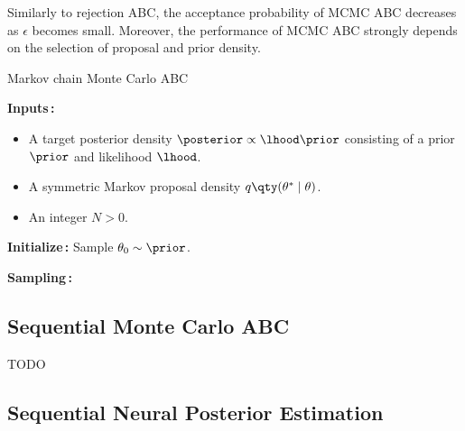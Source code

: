 Similarly to rejection ABC, the acceptance probability of MCMC ABC decreases as $\epsilon$ becomes small. Moreover, the performance of MCMC ABC strongly depends on the selection of proposal and prior density.

\begin{algorithm}[H]
\caption{Markov chain Monte Carlo ABC}
\label{alg:mcmcabc}
\SetAlgoLined
\DontPrintSemicolon
 \textbf{Inputs\,:}\;
 \vspace{-5mm}
 \begin{itemize}
     \item A target posterior density $\posterior \propto \lhood \prior$ consisting of a prior $\prior$ and likelihood $\lhood$. 
     \item A symmetric Markov proposal density $q \qty(\theta^* \mid \theta)$.
     \item An integer $N>0$.
 \end{itemize}
 
 \vspace{5mm}
 \textbf{Initialize\,:}\;
 Sample $\theta_0 \sim \prior$.\;

 \vspace{5mm}
 \textbf{Sampling\,:}\;
\end{algorithm}

\subsection{Sequential Monte Carlo ABC}\label{sec:smc_abc}

TODO

\subsection{Sequential Neural Posterior Estimation}

